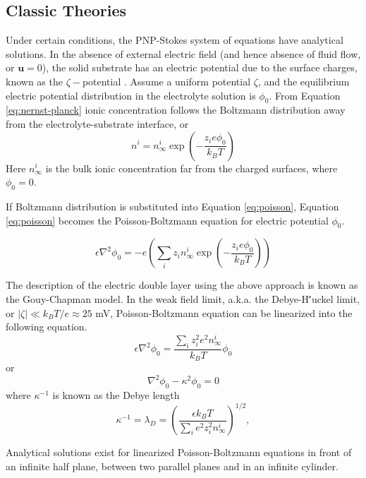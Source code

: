 \subsection{Classic Theories}
Under certain conditions, the PNP-Stokes system of equations have analytical solutions. In the absence of external electric field (and hence absence of fluid flow, or $\mathbf{u}=0$), the solid substrate has an electric potential due to the surface charges, known as the $\zeta-$potential \cite{kirby2004zeta,kirby2004zeta2}. Assume a uniform potential $\zeta$, and the equilibrium electric potential distribution in the electrolyte solution is $\phi_0$. From Equation \ref{eq:nernst-planck} ionic concentration follows the Boltzmann distribution away from the electrolyte-substrate interface, or
\begin{equation}
n^i = n_\infty^i \exp \left( -\frac{z_i e \phi_0}{k_BT} \right)
\end{equation}
Here $n_\infty^i$ is the bulk ionic concentration far from the charged surfaces, where $\phi_0=0$.

If Boltzmann distribution is substituted into Equation \ref{eq:poisson}, Equation \ref{eq:poisson} becomes the Poisson-Boltzmann equation for electric potential $\phi_0$. 

\begin{equation}
\epsilon \nabla^2\phi_0 = - e \left(\sum_i z_i n_\infty^i \exp \left( -\frac{z_i e \phi_0}{k_BT} \right) \right)
\label{eq:poisson-boltzmann}
\end{equation}

The description of the electric double layer using the above approach is known as the Gouy-Chapman model\cite{ghosal2006electrokinetic}. In the weak field limit, a.k.a. the Debye-H\''{u}ckel limit, or $|\zeta|\ll k_BT/e\approx 25$ mV, Poisson-Boltzmann equation can be linearized into the following equation. 
\begin{equation}
\epsilon \nabla^2\phi_0 = \frac{\sum_i z_i^2 e^2 n_\infty^i}{k_BT} \phi_0
\end{equation}
or
\begin{equation} 
\nabla^2\phi_0 - \kappa^2 \phi_0 = 0
\end{equation}
where $\kappa^{-1}$ is known as the Debye length
\begin{equation}
\kappa^{-1}=\lambda_D=\left(\frac{\epsilon k_BT}{\sum_i e^2 z_i^2n_\infty^i}\right)^{1/2},
\end{equation}

Analytical solutions exist for linearized Poisson-Boltzmann equations in front of an infinite half plane, between two parallel planes and in an infinite cylinder\cite{ghosal2006electrokinetic,ghosal2010mathematical}.

